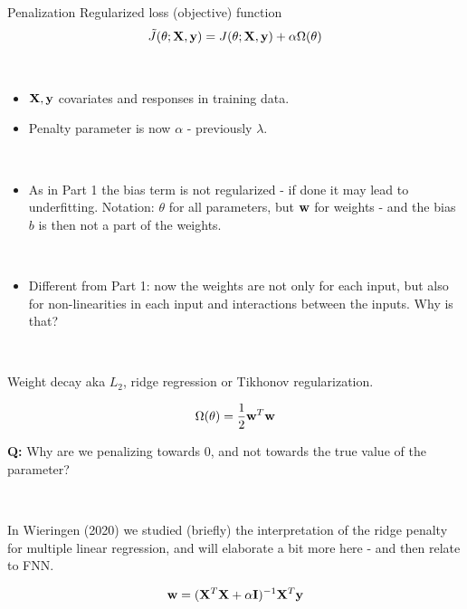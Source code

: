 \documentclass[
  ignorenonframetext,
]{beamer}
\providecommand{\tightlist}{%
  \setlength{\itemsep}{0pt}\setlength{\parskip}{0pt}}
\begin{document}
\begin{frame}
\begin{block}{Penalization}
\protect\hypertarget{penalization}{}
Regularized loss (objective) function
\[\tilde{J}(\theta; {\bf X}, {\bf y})=J(\theta; {\bf X}, {\bf y})+\alpha \Omega(\theta)\]

\(~\)

\begin{itemize}
\tightlist
\item
  \({\bf X}, {\bf y}\) covariates and responses in training data.
\item
  Penalty parameter is now \(\alpha\) - previously \(\lambda\).
\end{itemize}

\(~\)

\begin{itemize}
\tightlist
\item
  As in Part 1 the bias term is not regularized - if done it may lead to
  underfitting. Notation: \(\theta\) for all parameters, but \({\bf w}\)
  for weights - and the bias \(b\) is then not a part of the weights.
\end{itemize}

\(~\)

\begin{itemize}
\tightlist
\item
  Different from Part 1: now the weights are not only for each input,
  but also for non-linearities in each input and interactions between
  the inputs. Why is that?
\end{itemize}

\(~\)
\end{block}
\end{frame}

\begin{frame}
\begin{block}{Weight decay}
\protect\hypertarget{weight-decay}{}
aka \(L_2\), ridge regression or Tikhonov regularization.

\[\Omega(\theta)=\frac{1}{2} {\bf w}^T {\bf w}\]

\textbf{Q:} Why are we penalizing towards 0, and not towards the true
value of the parameter?

\(~\)

In Wieringen (2020) we studied (briefly) the interpretation of the ridge
penalty for multiple linear regression, and will elaborate a bit more
here - and then relate to FNN.

\[ {\bf w}=({\bf X}^T{\bf X}+\alpha {\bf I})^{-1}{\bf X}^T{\bf y}\]
\end{block}
\end{frame}
\end{document}
